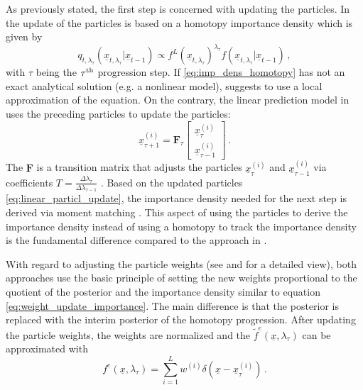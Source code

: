 \documentclass[a4paper]{IEEEtran}
\begin{document}
As previously stated, the first step is concerned with updating the particles. In \cite{bunch2013a} the update of the particles is based on a homotopy importance density which is given by 
\begin{equation}
    q_{t, \lambda_{\tau}}(\underline{x}_{t, \lambda_{\tau}} \vert \underline{x}_{t-1}) \propto f^{L}(\underline{x}_{t,\lambda_{\tau}})^{\lambda_{\tau}} f(\underline{x}_{t,\lambda_{\tau}} \vert \underline{x}_{t-1}) \,,
    \label{eq:imp_dens_homotopy}
\end{equation}
with $\tau$ being the $\tau \textsuperscript{th}$ progression step.
If \eqref{eq:imp_dens_homotopy} has not an exact analytical solution (e.g. a nonlinear model), \cite{bunch2013a} suggests to use a local approximation of the equation. On the contrary, the linear prediction model in \cite{chlebek2016a} uses
the preceding particles to update the particles:
\begin{equation}
    \underline{x}_{\tau + 1}^{(i)} = \textbf{F}_{\tau}
        \begin{bmatrix}
            \underline{x}_{\tau}^{(i)} \\ 
            \underline{x}_{\tau -1}^{(i)}
        \end{bmatrix} \,.
        \label{eq:linear_particl_update}
\end{equation}
The $\textbf{F}$ is a transition matrix that adjusts the particles $\underline{x}_{\tau}^{(i)}$ and $\underline{x}_{\tau-1}^{(i)}$ via coefficients $T = \frac{\Delta\lambda_{\tau}}{\Delta\lambda_{\tau-1}}$ \cite{chlebek2016a}. Based on the updated particles \eqref{eq:linear_particl_update}, the importance density needed for the next step is derived via moment matching \cite{chlebek2016a}.
This aspect of using the particles to derive the importance density instead of using a homotopy to track the importance density is the fundamental difference compared to the approach in \cite{bunch2013a}.

With regard to adjusting the particle weights (see \cite{bunch2013a} and \cite{chlebek2016a} for a detailed view), both approaches use the basic principle of setting the new weights proportional to the quotient of the posterior and the importance density similar to equation \eqref{eq:weight_update_importance}. The main difference is that the posterior is replaced with the interim posterior of the homotopy progression. 
After updating the particle weights, the weights are normalized and the $\tilde{f}^{e}(\underline{x}, \lambda_{\tau})$ can be approximated with 
\begin{equation}
    f^{e}(\underline{x}, \lambda_{\tau}) = \sum_{i=1}^{L}w^{(i)}\delta(\underline{x}-\underline{x}_{\tau}^{(i)}) \,.
    \label{eq:dirac_approx_interim_posterior}
 \end{equation}
\end{document}
